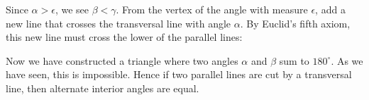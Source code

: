\documentclass[newpage,hints,handout,noauthor,nooutcomes,12pt]{ximera}
\begin{document}
\begin{problem}
\begin{freeResponse}
\begin{image}
\begin{tikzpicture}[geometryDiagrams]
\end{tikzpicture}
\end{image}

Since $\alpha> \epsilon$, we see $\beta < \gamma$.  From the vertex of
the angle with measure $\epsilon$, add a new line that crosses the
transversal line with angle $\alpha$. By Euclid's fifth axiom, this new line must cross
the lower of the parallel lines:
\begin{image}
\end{image}

Now we have constructed a triangle where two angles $\alpha$ and
$\beta$ sum to $180^\circ$. As we have seen, this is impossible. Hence
if two parallel lines are cut by a transversal line, then alternate
interior angles are equal.
\end{freeResponse}

\end{problem}
\end{document}
